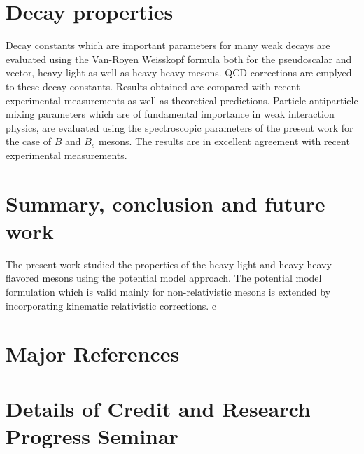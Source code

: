 \documentclass[draft,11pt]{scrreprt}
\begin{document}
\chapter{Decay properties}
Decay constants which are important parameters for many weak decays are evaluated using the Van-Royen Weisskopf formula both for the pseudoscalar and vector, heavy-light as well as heavy-heavy mesons. QCD corrections are emplyed to these decay constants. Results obtained are compared with recent experimental measurements as well as theoretical predictions. Particle-antiparticle mixing parameters which are of fundamental importance in weak interaction physics, are evaluated using the spectroscopic parameters of the present work for the case of $B$ and $B_s$  mesons. The results are in excellent agreement with recent experimental measurements.
\chapter{Summary, conclusion and future work}

The present work studied the properties of the heavy-light and heavy-heavy flavored mesons using the potential model approach. The potential model formulation which is valid mainly for non-relativistic mesons is extended by incorporating kinematic relativistic corrections. c

\chapter*{Major References}


\newpage

\chapter*{Details of Credit and Research Progress Seminar}
\cite{devlani2012spectroscopy}
\cite{devlani2011p}
\cite{devlani2009spectra}
\cite{devlani2010spectrum}
\cite{rai2009decay}
\end{document}
